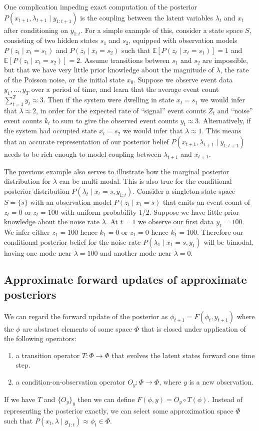 \documentclass[twoside, 11pt]{article}
\newcommand{\E}[0] {\mathbb{E}} %
\begin{document}
One complication impeding exact computation of the posterior $P(x_{t+1}, \lambda_{t+1} \mid y_{1:t+1})$ is the coupling between the latent variables $\lambda_{t}$ and $x_{t}$ after conditioning on $y_{1:t}$. For a simple example of this, consider a state space $S$, consisting of two hidden states $s_1$ and $s_2$, equipped with observation models $P(z_t \mid x_t=s_1)$ and $P(z_t \mid x_t=s_2)$ such that $\E \left[ P(z_t \mid x_t=s_1) \right] = 1$ and $\E \left[ P(z_t \mid x_t=s_2) \right] = 2$. Assume transitions between $s_1$ and $s_2$ are impossible, but that we have very little prior knowledge about the magnitude of $\lambda$, the rate of the Poisson noise, or the initial state $x_0$. Suppose we observe event data $y_1, \ldots, y_T$ over a period of time, and learn that the average event count $\sum_{t=1}^T y_t \approx 3$.  Then if the system were dwelling in state $x_t=s_1$ we would infer that $\lambda \approx 2$, in order for the expected rate of ``signal'' event counts $Z_t$ and ``noise'' event counts $k_t$ to sum to give the observed event counts $y_t \approx 3$. Alternatively, if the system had occupied state $x_t=s_2$ we would infer that $\lambda \approx 1$. This means that an accurate representation of our posterior belief $P(x_{t+1}, \lambda_{t+1} \mid y_{1:t+1})$ needs to be rich enough to model coupling between $\lambda_{t+1}$ and $x_{t+1}$.

The previous example also serves to illustrate how the marginal posterior distribution for $\lambda$ can be multi-modal. This is also true for the conditional posterior distribution $P(\lambda_t \mid x_t=s, y_{1:t})$. Consider a singleton state space $S=\{s\}$ with an observation model $P(z_t \mid x_t=s)$ that emits an event count of $z_t=0$ or $z_t=100$ with uniform probability $1/2$. Suppose we have little prior knowledge about the noise rate $\lambda$. At $t=1$ we observe our first data $y_1=100$. We infer either $z_1=100$ hence $k_1=0$ or $z_1=0$ hence $k_1=100$. Therefore our conditional posterior belief for the noise rate $P(\lambda_1 \mid x_1=s, y_1)$ will be bimodal, having one mode near $\lambda=100$ and another mode near $\lambda=0$.

\subsection{Approximate forward updates of approximate posteriors}
We can regard the forward update of the posterior as $\phi_{t+1} = F \left( \phi_t, y_{t+1} \right)$ where the $\phi$ are abstract elements of some space $\Phi$ that is closed under application of the following operators:
\begin{enumerate}
\item a transition operator $T : \Phi \rightarrow \Phi$ that evolves the latent states forward one time step.
\item a condition-on-observation operator $O_y : \Phi \rightarrow \Phi$, where $y$ is a new observation.
\end{enumerate}
If we have $T$ and $\{O_y\}_{y}$ then we can define $F(\phi, y) = O_{y} \circ T (\phi)$. Instead of representing the posterior exactly, we can select some approximation space $\Phi$ such that $P(x_t, \lambda \mid y_{1:t} ) \approx \phi_t \in \Phi$.
\end{document}
